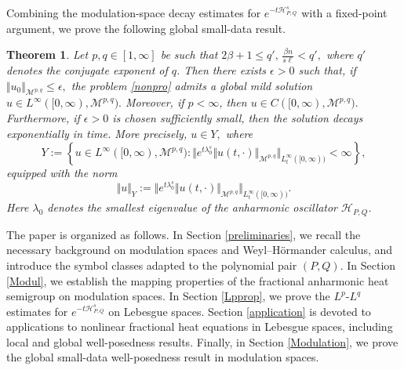 \documentclass[12pt, reqno]{amsart}
\newtheorem{theorem}{Theorem}[section]
\theoremstyle{definition}
\theoremstyle{remark}
\numberwithin{equation}{section}
\newcommand{\APQ}{\mathcal{H}_{P, Q}}
\begin{document}
Combining the modulation-space decay estimates for $e^{-t\APQ^s}$ with a fixed-point argument, we prove the following global small-data result.

\begin{theorem}
\label{mod_global_nonlinear}
Let $p,q\in[1,\infty]$ be such that
$2\beta+1\leq q',
   \,
    \frac{\beta n}{s\ell}<q',$
where $q'$ denotes the conjugate exponent of $q$. Then there exists $\epsilon>0$ such that, if $\Vert u_0\Vert_{\mathcal M^{p,q}}\leq \epsilon,$
the problem \eqref{nonpro} admits a global mild solution $ u\in L^\infty([0,\infty),\mathcal M^{p,q}).$ Moreover, if $p<\infty$, then $u\in C([0,\infty),\mathcal M^{p,q}).$ Furthermore, if $\epsilon>0$ is chosen sufficiently small, then the solution decays exponentially in time. More precisely, $u\in Y,$
where
\begin{equation}
\label{spaceY}
    Y
    :=
    \left\{
    u\in L^\infty([0,\infty),\mathcal M^{p,q})
    :
    \Big\Vert
    e^{t\lambda_0^s}
    \Vert u(t,\cdot)\Vert_{\mathcal M^{p,q}}
    \Big\Vert_{L_t^\infty([0,\infty))}
    <\infty
    \right\},
\end{equation}
equipped with the norm
\begin{equation}
\label{Ynorm}
    \Vert u\Vert_Y
    :=
    \Big\Vert
    e^{t\lambda_0^s}
    \Vert u(t,\cdot)\Vert_{\mathcal M^{p,q}}
    \Big\Vert_{L_t^\infty([0,\infty))}.
\end{equation}
Here $\lambda_0$ denotes the smallest eigenvalue of the anharmonic oscillator $\APQ$.
\end{theorem}





The paper is organized as follows. In Section \ref{preliminaries}, we recall the necessary background on modulation spaces and Weyl--H\"ormander calculus, and introduce the symbol classes adapted to the polynomial pair $(P,Q)$. In Section \ref{Modul}, we establish the mapping properties of the fractional anharmonic heat semigroup on modulation spaces. In Section \ref{Lpprop}, we prove the $L^p$-$L^q$ estimates for $e^{-t\APQ^s}$ on Lebesgue spaces. Section \ref{application} is devoted to applications to nonlinear fractional heat equations in Lebesgue spaces, including local and global well-posedness results. Finally, in Section \ref{Modulation}, we prove the global small-data well-posedness result in modulation spaces.
\end{document}
